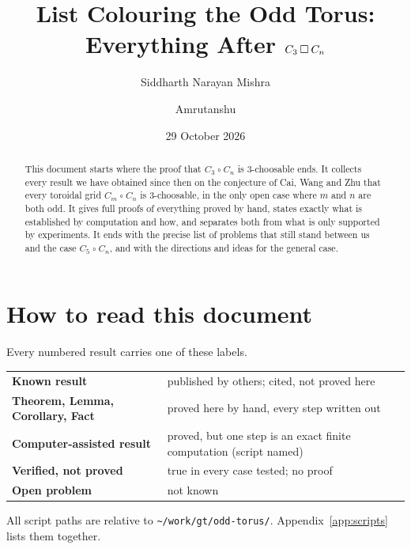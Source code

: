 \documentclass[11pt]{article}
\title{List Colouring the Odd Torus:\\ Everything After $C_3 \T C_n$}
\author{Siddharth Narayan Mishra \and Amrutanshu}
\date{29 October 2026}
\theoremstyle{plain}
\theoremstyle{definition}
\theoremstyle{remark}
\newcommand{\T}{\mathbin{\square}}
\newcommand{\script}[1]{\texttt{#1}}
\begin{document}
\maketitle

\begin{abstract}
\noindent
This document starts where the proof that $C_3 \T C_n$ is 3-choosable ends. It collects every
result we have obtained since then on the conjecture of Cai, Wang and Zhu that every toroidal grid
$C_m \T C_n$ is 3-choosable, in the only open case where $m$ and $n$ are both odd. It gives full
proofs of everything proved by hand, states exactly what is established by computation and how, and
separates both from what is only supported by experiments. It ends with the precise list of problems
that still stand between us and the case $C_5 \T C_n$, and with the directions and ideas for the
general case.
\end{abstract}

\tableofcontents

\section*{How to read this document}

Every numbered result carries one of these labels.

\begin{center}
\renewcommand{\arraystretch}{1.25}
\begin{tabular}{@{}p{5.2cm}p{9.6cm}@{}}
\toprule
\textbf{Known result} & published by others; cited, not proved here\\
\textbf{Theorem, Lemma, Corollary, Fact} & proved here by hand, every step written out\\
\textbf{Computer-assisted result} & proved, but one step is an exact finite computation (script named)\\
\textbf{Verified, not proved} & true in every case tested; no proof\\
\textbf{Open problem} & not known\\
\bottomrule
\end{tabular}
\end{center}

All script paths are relative to \script{\textasciitilde/work/gt/odd-torus/}. Appendix~\ref{app:scripts}
lists them together.
\end{document}
